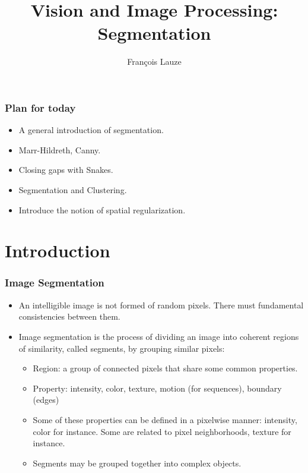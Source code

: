 \documentclass[9pt]{beamer}
\title{Vision and Image Processing:\\ Segmentation}
\author[F.~Lauze] %
{Fran{\c c}ois Lauze}
\institute[DIKU] %
{
  Department of Computer Science\\
  University of Copenhagen
}
\date[2015 B2] %
\begin{document}
\maketitle








\begin{frame}
  \frametitle{Plan for today}
  \begin{itemize}
  \item A general introduction of segmentation.\vfill
  \item Marr-Hildreth, Canny.\vfill
  \item Closing gaps with Snakes.\vfill
  \item Segmentation and Clustering.\vfill
  \item Introduce the notion of spatial regularization.
  \end{itemize}
\end{frame}

\section{Introduction}

\begin{frame}
  \frametitle{Image Segmentation}
  \begin{itemize}
  \item An intelligible image is not formed of random pixels. There must fundamental consistencies between them.\vfill
  \item Image segmentation is the process of dividing an image into
    coherent regions of similarity, called segments, by grouping similar pixels:\vfill
    \begin{itemize}
    \item Region:  a group of connected pixels that share some common properties.\vfill
    \item Property: intensity, color, texture, motion (for sequences), boundary (edges)\vfill
    \item Some of these properties can be defined in a pixelwise manner: intensity, color for instance. 
      Some are related to pixel neighborhoods, texture for instance.\vfill
    \item Segments may be grouped together into complex objects.
    \end{itemize}
 \end{itemize}
\end{frame}
\end{document}
